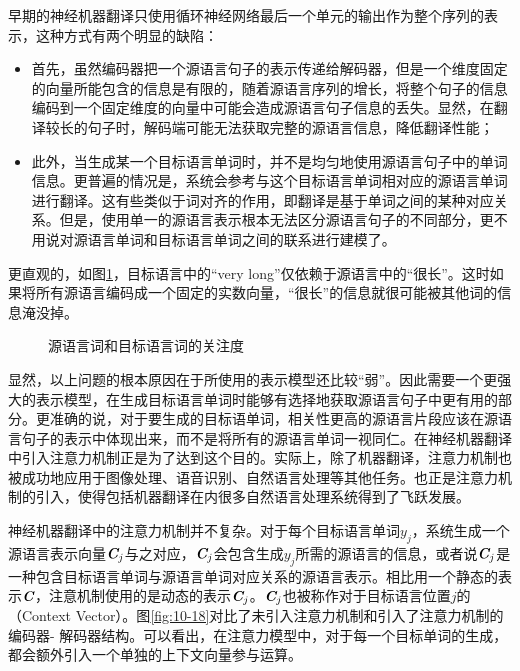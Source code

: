 \parinterval 早期的神经机器翻译只使用循环神经网络最后一个单元的输出作为整个序列的表示，这种方式有两个明显的缺陷：

\begin{itemize}
\vspace{0.5em}
\item 首先，虽然编码器把一个源语言句子的表示传递给解码器，但是一个维度固定的向量所能包含的信息是有限的，随着源语言序列的增长，将整个句子的信息编码到一个固定维度的向量中可能会造成源语言句子信息的丢失。显然，在翻译较长的句子时，解码端可能无法获取完整的源语言信息，降低翻译性能；
\vspace{0.5em}
\item 此外，当生成某一个目标语言单词时，并不是均匀地使用源语言句子中的单词信息。更普遍的情况是，系统会参考与这个目标语言单词相对应的源语言单词进行翻译。这有些类似于词对齐的作用，即翻译是基于单词之间的某种对应关系。但是，使用单一的源语言表示根本无法区分源语言句子的不同部分，更不用说对源语言单词和目标语言单词之间的联系进行建模了。
\vspace{0.5em}
\end{itemize}

\parinterval 更直观的，如图\ref{fig:10-17}，目标语言中的“very long”仅依赖于源语言中的“很长”。这时如果将所有源语言编码成一个固定的实数向量，“很长”的信息就很可能被其他词的信息淹没掉。

\begin{figure}[htp]
\centering

\caption{源语言词和目标语言词的关注度}
\label{fig:10-17}
\end{figure}

\parinterval 显然，以上问题的根本原因在于所使用的表示模型还比较“弱”。因此需要一个更强大的表示模型，在生成目标语言单词时能够有选择地获取源语言句子中更有用的部分。更准确的说，对于要生成的目标语单词，相关性更高的源语言片段应该在源语言句子的表示中体现出来，而不是将所有的源语言单词一视同仁。在神经机器翻译中引入注意力机制正是为了达到这个目的。实际上，除了机器翻译，注意力机制也被成功地应用于图像处理、语音识别、自然语言处理等其他任务。也正是注意力机制的引入，使得包括机器翻译在内很多自然语言处理系统得到了飞跃发展。

\parinterval 神经机器翻译中的注意力机制并不复杂。对于每个目标语言单词$y_j$，系统生成一个源语言表示向量$\textbf{\em C}_j$与之对应，$\textbf{\em C}_j$会包含生成$y_j$所需的源语言的信息，或者说$\textbf{\em C}_j$是一种包含目标语言单词与源语言单词对应关系的源语言表示。相比用一个静态的表示$\textbf{\em C}$，注意机制使用的是动态的表示$\textbf{\em C}_j$。$\textbf{\em C}_j$也被称作对于目标语言位置$j$的{\small{}}（Context Vector）。图\ref{fig:10-18}对比了未引入注意力机制和引入了注意力机制的编码器- 解码器结构。可以看出，在注意力模型中，对于每一个目标单词的生成，都会额外引入一个单独的上下文向量参与运算。

